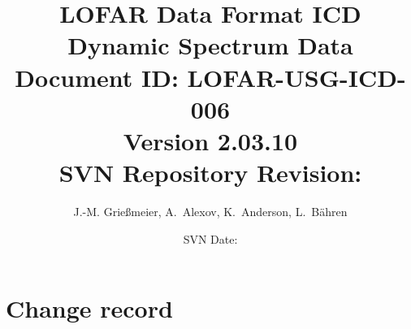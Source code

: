 \documentclass[a4paper,10pt,bibtotoc]{scrartcl}
\begin{document}

\title{LOFAR Data Format ICD \\ Dynamic Spectrum Data \\
{\normalsize Document ID: LOFAR-USG-ICD-006} \\ 
{\normalsize Version 2.03.10} \\
{\normalsize SVN Repository Revision: \svnInfoMaxRevision}}
\author{J.-M. Grie{\ss}meier, A.~Alexov, K.~Anderson, L.~B\"ahren}
\date{\small{SVN Date: \svnInfoMaxToday}}
\maketitle

\tableofcontents
\listoffigures
\listoftables

\clearpage


\section*{Change record}
\end{document}
